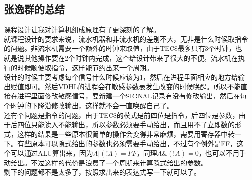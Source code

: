 \documentclass[UTF8]{ctexart}
\begin{document}
\subsection{张逸群的总结}
课程设计让我对计算机组成原理有了更深刻的了解。\\
\indent 就课程设计的要求来说，流水机器和非流水机的差别不大，无非是什么时候取指令的问题。非流水机需要一个额外的时钟来取值，由于TEC8最多只有3个时钟，也就是说其他操作要在2个时钟内完成，这个给设计带来了很大的不便。流水机在执行的时候顺便取指令，这样能节约出来一个周期。\\
\indent 设计的时候主要考虑每个信号什么时候应该为1，然后在进程里面相应的地方给输出赋值即可。然后VDHL的进程会在敏感参数表发生改变的时候唤醒。所以不能直接在进程里面修改敏感信号，要新建一个SIGNAL记录有没有修改输出，然后在每个时钟的下降沿修改输出，这样就不会一直唤醒自己了。\\
\indent 还有个问题是指令的问题，由于TEC8的模式是前四位是指令，后四位是参数，由于后四位只能读入不能输出，所以参数必须要手动给出，而且用不了立即数的形式，这样的结果是一些原本很简单的操作会变得非常麻烦，需要用寄存器中转一下。有些原本可以隐式给出的参数也必须需要手动给出，不过有个例外是FF，这个可以通过ALU算出来，因为$A|(!A)=FF$，同理$A\&(!A)=0$，也可以不用手动给出。不过这样的代价是浪费了一个周期来计算隐式给出的参数。\\
\indent 剩下的问题都不是太多了，按照求出来的表达式写一下就可以了。
\end{document}
